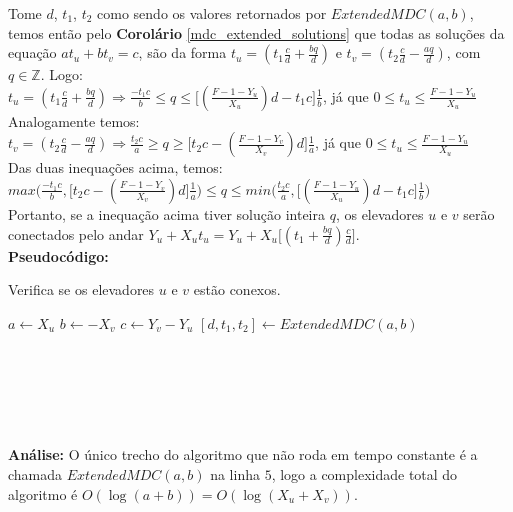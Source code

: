 Tome $d$, $t_1$, $t_2$ como sendo os valores retornados por $ExtendedMDC(a,b)$, temos então pelo \textbf{Corolário} \autoref{mdc_extended_solutions} que todas as soluções da
equação $at_u + bt_v = c$, são da forma $t_u = (t_1\frac{c}{d} + \frac{bq}{d})$ e $t_v = (t_2\frac{c}{d} - \frac{aq}{d})$, com $q \in\mathbb{Z}$. Logo:
\\

$t_u = (t_1\frac{c}{d} + \frac{bq}{d}) \Rightarrow \frac{-t_1c}{b} \leq q \leq \big[(\frac{F-1-Y_u}{X_u})d - t_1c\big]\frac{1}{b}$, já que $0\leq t_u\leq \frac{F-1-Y_u}{X_u}$
\\

Analogamente temos:
\\

$t_v = (t_2\frac{c}{d} - \frac{aq}{d}) \Rightarrow \frac{t_2c}{a} \geq q \geq \big[t_2c - (\frac{F-1-Y_v}{X_v})d\big]\frac{1}{a}$, já que $0\leq t_u\leq \frac{F-1-Y_u}{X_u}$
\\

Das duas inequações acima, temos:
\\

$max\Big(\frac{-t_1c}{b}, \big[t_2c - (\frac{F-1-Y_v}{X_v})d\big]\frac{1}{a} \Big) \leq q \leq min\Big(\frac{t_2c}{a}, \big[(\frac{F-1-Y_u}{X_u})d - t_1c\big]\frac{1}{b}  \Big)$
\\

Portanto, se a inequação acima tiver solução inteira $q$, os elevadores $u$ e $v$ serão conectados pelo andar $Y_u+X_ut_u = Y_u+X_u\big[(t_1 + \frac{bq}{d})\frac{c}{d}\big]$.
\\

\textbf{Pseudocódigo:}
\begin{algorithm}
\caption{Verifica se os elevadores $u$ e $v$ estão conexos.}\label{euclid}
\begin{algorithmic}[1]
\State $a \gets X_u$
\State $b \gets -X_v$
\State $c \gets Y_v-Y_u$
\State $[d,t_1,t_2] \gets ExtendedMDC(a,b)$
\\
\State {}
\EndIf
\\
\State {}
\EndIf
\\
\\
\\
\State {}
\EndIf
\\
\State {}

\EndProcedure
\end{algorithmic}
\end{algorithm}

\textbf{Análise:}
O único trecho do algoritmo que não roda em tempo constante é a chamada $ExtendedMDC(a,b)$ na linha $5$, logo a complexidade total do algoritmo é $O(\log(a+b)) = O(\log(X_u+X_v))$.
